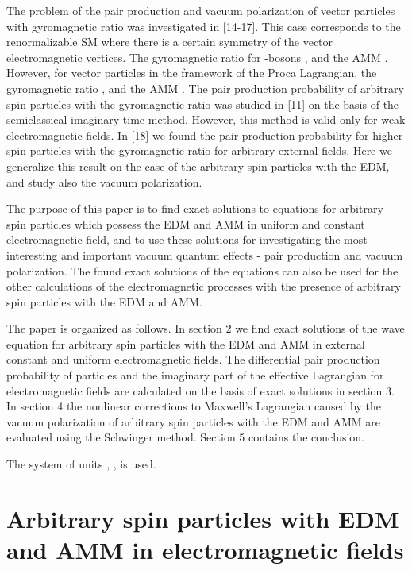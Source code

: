 \documentclass[a4paper,12pt]{article}
\begin{document}
The problem of the pair production and vacuum polarization of
vector particles with gyromagnetic ratio \coordHE{} was investigated in
[14-17]. This case corresponds to the renormalizable SM where
there is a certain symmetry of the vector electromagnetic
vertices. The gyromagnetic ratio for \coordHE{}-bosons \coordHE{},
and the AMM \coordHE{}. However, for vector particles in the
framework of the Proca Lagrangian, the gyromagnetic ratio \coordHE{},
and the AMM \coordHE{}. The pair production probability of
arbitrary spin particles with the gyromagnetic ratio \coordHE{} was
studied in [11] on the basis of the semiclassical imaginary-time
method. However, this method is valid only for weak
electromagnetic fields. In [18] we found the pair production
probability for higher spin particles with the gyromagnetic ratio
\coordHE{} for arbitrary external fields. Here we generalize this result
on the case of the arbitrary spin particles with the EDM, and
study also the vacuum polarization.

The purpose of this paper is to find exact solutions to equations for
arbitrary spin particles which possess the EDM and AMM in uniform and
constant electromagnetic field, and to use these solutions for investigating
the most interesting and important vacuum quantum effects - pair production
and vacuum polarization. The found exact solutions of the equations can also
be used for the other calculations of the electromagnetic processes with the
presence of arbitrary spin particles with the EDM and AMM.

The paper is organized as follows. In section 2 we find exact solutions of
the wave equation for arbitrary spin particles with the EDM and AMM in
external constant and uniform electromagnetic fields. The differential pair
production probability of particles and the imaginary part of the effective
Lagrangian for electromagnetic fields are calculated on the basis of exact
solutions in section 3. In section 4 the nonlinear corrections to Maxwell's
Lagrangian caused by the vacuum polarization of arbitrary spin particles
with the EDM and AMM are evaluated using the Schwinger method. Section 5
contains the conclusion.

The system of units \coordHE{}, \coordHE{}, \coordHE{} is used.

\section{Arbitrary spin particles with EDM and AMM in
electromagnetic fields}
\end{document}
